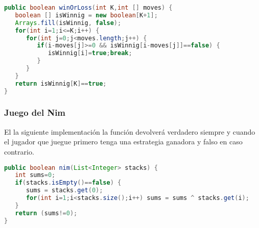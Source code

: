 \begin{lstlisting}[language=Java]
public boolean winOrLoss(int K,int [] moves) {
   boolean [] isWinnig = new boolean[K+1];
   Arrays.fill(isWinnig, false);
   for(int i=1;i<=K;i++) {
      for(int j=0;j<moves.length;j++) {
         if(i-moves[j]>=0 && isWinnig[i-moves[j]]==false) {
            isWinnig[i]=true;break;
         }
      }
   }
   return isWinnig[K]==true;
}
\end{lstlisting}

\subsubsection{Juego del Nim}

El la siguiente implementación la función devolverá verdadero siempre y cuando el jugador que juegue primero tenga una estrategia ganadora y falso en caso contrario.

\begin{lstlisting}[language=Java]
public boolean nim(List<Integer> stacks) {
   int sums=0;
   if(stacks.isEmpty()==false) {
      sums = stacks.get(0);
      for(int i=1;i<stacks.size();i++) sums = sums ^ stacks.get(i);
   }
   return (sums!=0);
}
\end{lstlisting}
